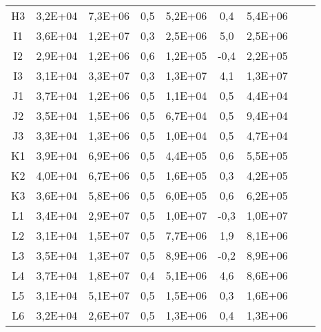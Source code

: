 \begin{center}
\begin{longtable}{ccccccccc}
H3    & 3,2E+04 & 7,3E+06 & 0,5   & 5,2E+06 & 0,4   & 5,4E+06 \\
I1    & 3,6E+04 & 1,2E+07 & 0,3   & 2,5E+06 & 5,0   & 2,5E+06 \\
I2    & 2,9E+04 & 1,2E+06 & 0,6   & 1,2E+05 & -0,4  & 2,2E+05 \\
I3    & 3,1E+04 & 3,3E+07 & 0,3   & 1,3E+07 & 4,1   & 1,3E+07 \\
J1    & 3,7E+04 & 1,2E+06 & 0,5   & 1,1E+04 & 0,5   & 4,4E+04 \\
J2    & 3,5E+04 & 1,5E+06 & 0,5   & 6,7E+04 & 0,5   & 9,4E+04 \\
J3    & 3,3E+04 & 1,3E+06 & 0,5   & 1,0E+04 & 0,5   & 4,7E+04 \\
K1    & 3,9E+04 & 6,9E+06 & 0,5   & 4,4E+05 & 0,6   & 5,5E+05 \\
K2    & 4,0E+04 & 6,7E+06 & 0,5   & 1,6E+05 & 0,3   & 4,2E+05 \\
K3    & 3,6E+04 & 5,8E+06 & 0,5   & 6,0E+05 & 0,6   & 6,2E+05 \\
L1    & 3,4E+04 & 2,9E+07 & 0,5   & 1,0E+07 & -0,3  & 1,0E+07 \\
L2    & 3,1E+04 & 1,5E+07 & 0,5   & 7,7E+06 & 1,9   & 8,1E+06 \\
L3    & 3,5E+04 & 1,3E+07 & 0,5   & 8,9E+06 & -0,2  & 8,9E+06 \\
L4    & 3,7E+04 & 1,8E+07 & 0,4   & 5,1E+06 & 4,6   & 8,6E+06 \\
L5    & 3,1E+04 & 5,1E+07 & 0,5   & 1,5E+06 & 0,3   & 1,6E+06 \\
L6    & 3,2E+04 & 2,6E+07 & 0,5   & 1,3E+06 & 0,4   & 1,3E+06 \\
\end{longtable}
\end{center}

